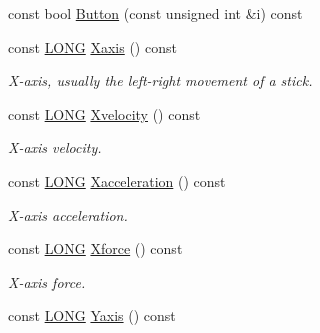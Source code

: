 \begin{DoxyCompactItemize}
\item 
const bool \hyperlink{class_c_joypad_a0125d648a2866c9524e70e3ddeb8b675}{Button} (const unsigned int \&i) const
\item 
\mbox{\label{class_c_joypad_a1f707897b1f4d894ced92de429fb9a40}} 
const \hyperlink{_joypad_8h_a2a3e0cda5f1249bef6db47c5eb8e3813}{L\+O\+NG} \hyperlink{class_c_joypad_a1f707897b1f4d894ced92de429fb9a40}{Xaxis} () const
\begin{DoxyCompactList}\small\item\em X-\/axis, usually the left-\/right movement of a stick. \end{DoxyCompactList}\item 
\mbox{\label{class_c_joypad_a17e3e401cf2e9dbf42e1f65f3b57e26a}} 
const \hyperlink{_joypad_8h_a2a3e0cda5f1249bef6db47c5eb8e3813}{L\+O\+NG} \hyperlink{class_c_joypad_a17e3e401cf2e9dbf42e1f65f3b57e26a}{Xvelocity} () const
\begin{DoxyCompactList}\small\item\em X-\/axis velocity. \end{DoxyCompactList}\item 
\mbox{\label{class_c_joypad_a5af5c8672ac198b58276d66ff18aac19}} 
const \hyperlink{_joypad_8h_a2a3e0cda5f1249bef6db47c5eb8e3813}{L\+O\+NG} \hyperlink{class_c_joypad_a5af5c8672ac198b58276d66ff18aac19}{Xacceleration} () const
\begin{DoxyCompactList}\small\item\em X-\/axis acceleration. \end{DoxyCompactList}\item 
\mbox{\label{class_c_joypad_af51813f326c05193ff99463d2ac9b969}} 
const \hyperlink{_joypad_8h_a2a3e0cda5f1249bef6db47c5eb8e3813}{L\+O\+NG} \hyperlink{class_c_joypad_af51813f326c05193ff99463d2ac9b969}{Xforce} () const
\begin{DoxyCompactList}\small\item\em X-\/axis force. \end{DoxyCompactList}\item 
\mbox{\label{class_c_joypad_a56189bd2a74dac283c2e2811f3e43598}} 
const \hyperlink{_joypad_8h_a2a3e0cda5f1249bef6db47c5eb8e3813}{L\+O\+NG} \hyperlink{class_c_joypad_a56189bd2a74dac283c2e2811f3e43598}{Yaxis} () const

\end{DoxyCompactItemize}
